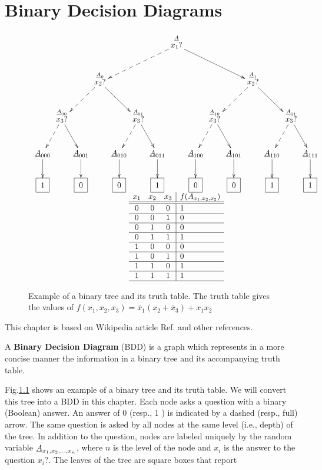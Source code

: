 \chapter{Binary Decision Diagrams}\label{ch-binarydd}

\begin{figure}[h!]
$$
\begin{array}{c}
\xymatrix@C=.1pc{
&&&&&&&\stackrel{\rvA}{x_1?}\ar@{-->}[dllll]
\ar[drrrr]
\\
&&&\stackrel{\rvA_0}{x_2?}\ar@{-->}[dll]\ar[drr]
&&&&&&&&\stackrel{\rvA_1} {x_2?}\ar@{-->}[dll]\ar[drr]
\\
&\stackrel{\rvA_{00}}{ x_3?}\ar@{-->}[dl]\ar[dr]
&&&&\stackrel{\rvA_{01}} {x_3?}\ar@{-->}[dl]\ar[dr]
&&&&\stackrel{\rvA_{10}}{ x_3?}\ar@{-->}[dl]\ar[dr]
&&&&\stackrel{\rvA_{11}}{x_3?}\ar@{-->}[dl]\ar[dr]
\\
\rvA_{000}\ar[d]
&&\rvA_{001}\ar[d]
&&\rvA_{010}\ar[d]
&&\rvA_{011}\ar[d]
&&\rvA_{100}\ar[d]
&&\rvA_{101}\ar[d]
&&\rvA_{110}\ar[d]
&&\rvA_{111}\ar[d]
\\
\Rect{1}
&&\Rect{0}
&&\Rect{0}
&&\Rect{1}
&&\Rect{0}
&&\Rect{0}
&&\Rect{1}
&&\Rect{1}
}
\\
\begin{array}{ccc|l}
x_1&x_2&x_3&f(A_{x_1,x_2,x_2})
\\ \hline\hline
0
&0
&0
&1
\\ \hline
0
&0
&1
&0
\\ \hline
0
&1
&0
&0
\\ \hline
0
&1
&1
&1
\\ \hline
1
&0
&0
&0
\\ \hline
1
&0
&1
&0
\\ \hline
1
&1
&0
&1
\\ \hline
1
&1
&1
&1
\\ \hline
\end{array}
\end{array}
$$
\caption{Example of a binary tree and its truth table.
The truth table gives the values of $
f(x_1, x_2,x_3)=
\bar{x}_1(x_2+\bar{x}_3)  + x_1 x_2 $ }
\label{fig-bdd-tree}
\end{figure}

This chapter is based
on Wikipedia article Ref.\cite{wiki-bdd}
and other references.

A {\bf Binary Decision Diagram} (BDD) is a 
graph which represents 
in a more concise manner
the information in
a binary tree and
its accompanying truth table.

Fig.\ref{fig-bdd-tree} shows an
example of a binary tree and its 
truth table.
We will  convert this tree 
 into a BDD in this chapter. Each node asks a question with a binary (Boolean) answer. An answer of 0 (resp., 1 ) is indicated by a dashed (resp., full) arrow. The same question is asked by all nodes at the same level (i.e., depth) of the tree. In addition to the question, nodes are labeled uniquely by the random variable $\rvA_{x_1, x_2, \ldots, x_n}$,
where $n$ is the level of the node
and $x_i$ is the answer to the question $x_i?$.
The leaves of
the tree are square boxes that report 

